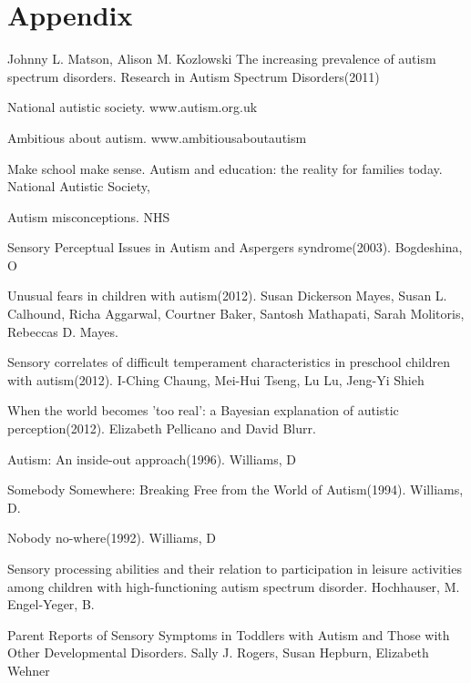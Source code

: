 \documentclass[11pt]{report}
\begin{document}
\chapter{Appendix}

\begin{thebibliography}{9}

Johnny L. Matson, Alison M. Kozlowski
The increasing prevalence of autism spectrum disorders. Research in Autism Spectrum Disorders(2011)

National autistic society. www.autism.org.uk

Ambitious about autism. www.ambitiousaboutautism

Make school make sense. Autism and education: the reality for families today. National Autistic Society, 

Autism misconceptions. NHS

Sensory Perceptual Issues in Autism and Aspergers syndrome(2003). Bogdeshina, O

Unusual fears in children with autism(2012). Susan Dickerson Mayes, Susan L. Calhound, Richa Aggarwal, Courtner Baker, Santosh Mathapati, Sarah Molitoris, Rebeccas D. Mayes.

Sensory correlates of difficult temperament characteristics in preschool children with autism(2012). I-Ching Chaung, Mei-Hui Tseng, Lu Lu, Jeng-Yi Shieh

When the world becomes 'too real': a Bayesian explanation of autistic perception(2012). Elizabeth Pellicano and David Blurr.

Autism: An inside-out approach(1996). Williams, D

Somebody Somewhere: Breaking Free from the World of Autism(1994). Williams, D.

Nobody no-where(1992). Williams, D

Sensory processing abilities and their relation to participation in leisure activities among children with high-functioning autism spectrum disorder. Hochhauser, M. Engel-Yeger, B.

Parent Reports of Sensory Symptoms in Toddlers with Autism and Those with Other Developmental Disorders. Sally J. Rogers, Susan Hepburn, Elizabeth Wehner


\end{thebibliography}
\end{document}
